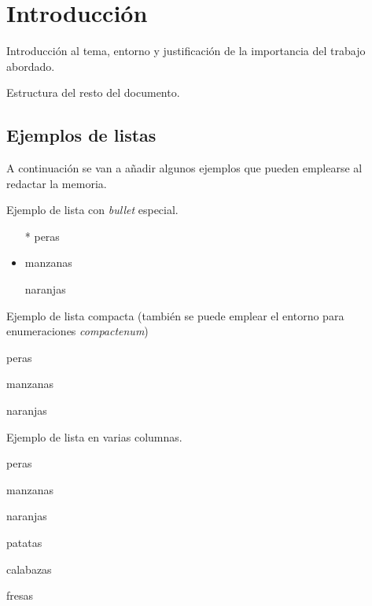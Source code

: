 \chapter{Introducción}
\label{cap:Introduccion}

Introducción al tema, entorno y justificación de la importancia del trabajo abordado.

Estructura del resto del documento.

\section{Ejemplos de listas}
\label{sec:ejListas}
A continuación se van a añadir algunos ejemplos que pueden emplearse al redactar la memoria.

\noindent Ejemplo de lista con \emph{bullet} especial. 
\begin{itemize}
	\item[*] peras
	\item manzanas
	\item[\ding{170}] naranjas
\end{itemize}

\noindent Ejemplo de lista compacta (también se puede emplear el entorno para enumeraciones \emph{compactenum})
\begin{compactitem}
	\item peras
	\item manzanas
	\item naranjas
\end{compactitem}


\noindent Ejemplo de lista en varias columnas.
\begin{multicols}{2} %
	\begin{compactenum}
		\item peras
		\item manzanas
		\item naranjas
		\item patatas
		\item calabazas
		\item fresas
	\end{compactenum}
\end{multicols}


